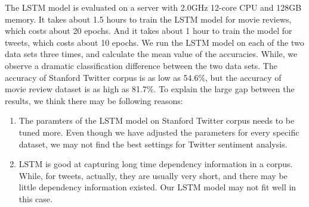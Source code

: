 The LSTM model is evaluated on a server with 2.0GHz 12-core CPU and 128GB memory. It takes about 1.5 hours to train the LSTM model for movie reviews, which costs about 20 epochs. And it takes about 1 hour to train the model for tweets, which costs about 10 epochs. We run the LSTM model on each of the two data sets three times, and calculate the mean value of the accuracies. While, we observe a dramatic classification difference between the two data sets. The accuracy of Stanford Twitter corpus is as low as 54.6\%, but the accuracy of movie review dataset is as high as 81.7\%. To explain the large gap between the results, we think there may be following reasons:

\begin{enumerate}
\item The paramters of the LSTM model on Stanford Twitter corpus needs to be tuned more. Even though we have adjusted the parameters for every specific dataset, we may not find the best settings for Twitter sentiment analysis.
\item LSTM is good at capturing long time dependency information in a corpus. While, for tweets, actually, they are usually very short, and there may be little dependency information existed. Our LSTM model may not fit well in this case.
\end{enumerate}
